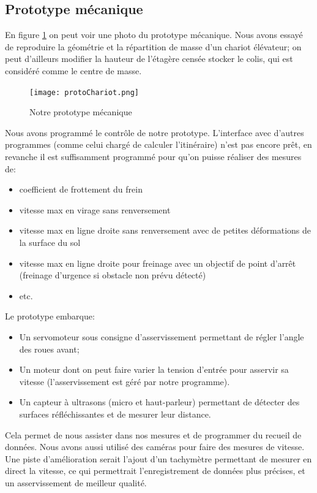 \subsection{Prototype mécanique}
\label{protoMeca}
En figure \ref{fig:photoProtoMeca} on peut voir une photo du prototype mécanique. Nous avons essayé de reproduire la géométrie et la répartition de masse d'un chariot élévateur; on peut d'ailleurs modifier la hauteur de l'étagère censée stocker le colis, qui est considéré comme le centre de masse.
\begin{figure}
	\centering
	\texttt{[image: protoChariot.png]}
	\caption{Notre prototype mécanique}
	\label{fig:photoProtoMeca}
\end{figure}
Nous avons programmé le contrôle de notre prototype. L'interface avec d'autres programmes (comme celui chargé de calculer l'itinéraire) n'est pas encore prêt, en revanche il est suffisamment programmé pour qu'on puisse réaliser des mesures de:
\begin{itemize}
	\item coefficient de frottement du frein
	\item vitesse max en virage sans renversement
	\item vitesse max en ligne droite sans renversement avec de petites déformations de la surface du sol
	\item vitesse max en ligne droite pour freinage avec un objectif de point d'arrêt (freinage d'urgence si obstacle non prévu détecté)
	\item etc.
\end{itemize}
Le prototype embarque:
\begin{itemize}
	\item Un servomoteur sous consigne d'asservissement permettant de régler l'angle des roues avant;
	\item Un moteur dont on peut faire varier la tension d'entrée pour asservir sa vitesse (l'asservissement est géré par notre programme).
	\item Un capteur à ultrasons (micro et haut-parleur) permettant de détecter des surfaces réfléchissantes et de mesurer leur distance.
\end{itemize}
Cela permet de nous assister dans nos mesures et de programmer du recueil de données. Nous avons aussi utilisé des caméras pour faire des mesures de vitesse. Une piste d'amélioration serait l'ajout d'un tachymètre permettant de mesurer en direct la vitesse, ce qui permettrait l'enregistrement de données plus précises, et un asservissement de meilleur qualité.\\
